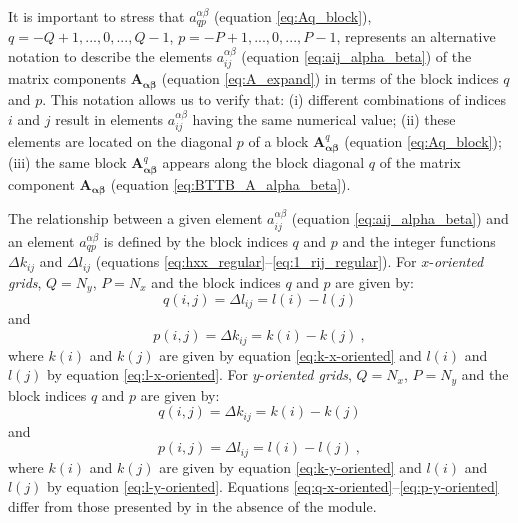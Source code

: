 It is important to stress that $a^{\alpha\beta}_{qp}$ (equation \ref{eq:Aq_block}), 
$q = -Q+1,...,0,..., Q-1$, $p = -P+1,...,0,...,P-1$, represents an alternative notation
to describe the elements $a^{\alpha\beta}_{ij}$ (equation \ref{eq:aij_alpha_beta}) of the matrix
components $\mathbf{A_{\boldsymbol{\alpha\beta}}}$ (equation \ref{eq:A_expand}) in terms of 
the block indices $q$ and $p$. This notation allows us to verify that: (i) different combinations
of indices $i$ and $j$ result in elements $a^{\alpha\beta}_{ij}$ having the same numerical 
value; (ii) these elements are located on the diagonal $p$ of a block 
$\mathbf{A}_{\boldsymbol{\alpha\beta}}^{q}$ (equation \ref{eq:Aq_block}); (iii) the same block 
$\mathbf{A}_{\boldsymbol{\alpha\beta}}^{q}$ appears along the block diagonal $q$ of the 
matrix component $\mathbf{A}_{\boldsymbol{\alpha\beta}}$ (equation \ref{eq:BTTB_A_alpha_beta}).

The relationship between a given element $a^{\alpha\beta}_{ij}$ (equation \ref{eq:aij_alpha_beta})
and an element $a^{\alpha\beta}_{qp}$ is defined by the block indices $q$ and $p$ 
and the integer functions $\Delta k_{ij}$ and $\Delta l_{ij}$ 
(equations \ref{eq:hxx_regular}--\ref{eq:1_rij_regular}).
For $x$-\textit{oriented grids}, $Q = N_{y}$, $P = N_{x}$ and the block indices
$q$ and $p$ are given by:
\begin{equation}
q(i, j) = \Delta l_{ij} = l(i) - l(j)
\label{eq:q-x-oriented}
\end{equation}
and
\begin{equation}
p(i, j) = \Delta k_{ij} =  k(i) - k(j) \: ,
\label{eq:p-x-oriented}
\end{equation}
where $k(i)$ and $k(j)$ are given by equation \ref{eq:k-x-oriented} and 
$l(i)$ and $l(j)$ by equation \ref{eq:l-x-oriented}.
For $y$-\textit{oriented grids}, $Q = N_{x}$, $P = N_{y}$ and the block indices
$q$ and $p$ are given by:
\begin{equation}
q(i, j) = \Delta k_{ij} = k(i) - k(j) 
\label{eq:q-y-oriented}
\end{equation}
and
\begin{equation}
p(i, j) = \Delta l_{ij} = l(i) - l(j) \: ,
\label{eq:p-y-oriented}
\end{equation}
where $k(i)$ and $k(j)$ are given by equation \ref{eq:k-y-oriented} and 
$l(i)$ and $l(j)$ by equation \ref{eq:l-y-oriented}.
Equations \ref{eq:q-x-oriented}--\ref{eq:p-y-oriented} differ from those presented by
\citet{takahashi2020convolutional} in the absence of the module.

